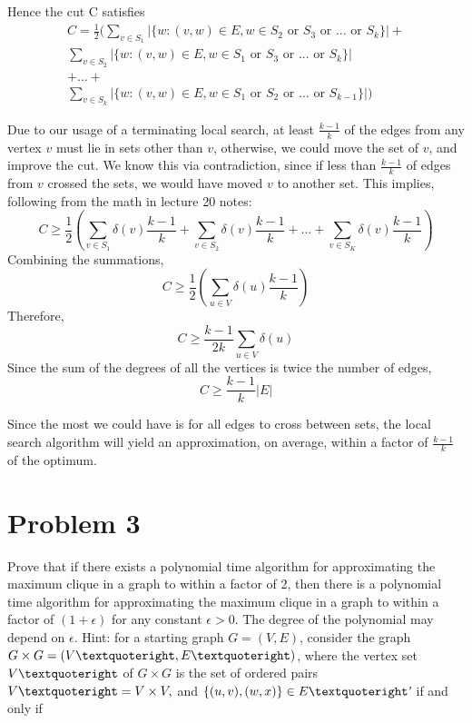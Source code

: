 \documentclass[11pt]{article}
\begin{document}
Hence the cut C satisfies
\begin{multline*}
	C= \frac{1}{2} (\sum_{v\in S_1}|\{w:(v,w)\in E, w \in S_2 \text{ or } S_3 \text{ or } ... \text{ or } S_k\}|+ \\
	\sum_{v\in S_2}|\{w:(v,w) \in E, w \in S_1\text{ or } S_3 \text{ or } ... \text{ or } S_k\}| \\
	+ ... + \\ 
	\sum_{v\in S_k}|\{w:(v,w) \in E, w \in S_1\text{ or } S_2 \text{ or } ... \text{ or } S_{k-1}\}|)
\end{multline*}

Due to our usage of a terminating local search, at least $\frac{k-1}{k}$ of the edges from any vertex $v$ must lie in sets other than $v$, otherwise, we could move the set of $v$, and improve the cut. We know this via contradiction, since if less than $\frac{k-1}{k}$ of edges from $v$ crossed the sets, we would have  moved $v$ to another set. This implies, following from the math in lecture 20 notes:
\begin{equation*}
	C \geq \frac{1}{2}(\sum_{v \in S_1} \delta(v)\frac{k-1}{k} + \sum_{v \in S_2} \delta(v)\frac{k-1}{k} + ... + \sum_{v \in S_K} \delta(v)\frac{k-1}{k})	
\end{equation*}
Combining the summations,
\begin{equation*}
	C \geq \frac{1}{2}(\sum_{u \in V} \delta(u)\frac{k-1}{k})	
\end{equation*}
Therefore,
\begin{equation*}
	C \geq \frac{k-1}{2k}\sum_{u \in V} \delta(u)
\end{equation*}
Since the sum of the degrees of all the vertices is twice the number of edges,
\begin{equation*}
	C \geq \frac{k-1}{k}|E|
\end{equation*}

Since the most we could have is for all edges to cross between sets, the local search algorithm will yield an approximation, on average, within a factor of $\frac{k-1}{k}$ of the optimum.

\section{Problem 3}
Prove that if there exists a polynomial time algorithm for approximating the maximum clique in a graph to within a factor of 2, then there is a polynomial time algorithm for approximating the maximum clique in a graph to within a factor of $(1 + \epsilon)$ for any constant $\epsilon > 0$. The degree of the polynomial may depend on $\epsilon$. Hint: for a starting graph $G = (V,E)$, consider the graph $G \times G = (V \textquoteright ,E\textquoteright)$, where the vertex set $V\textquoteright$ of $G \times G$ is the set of ordered pairs $V\textquoteright = V \times V,$ and $\{(u,v),(w,x)\} \in E\textquoteright$′ if and only if
\end{document}
